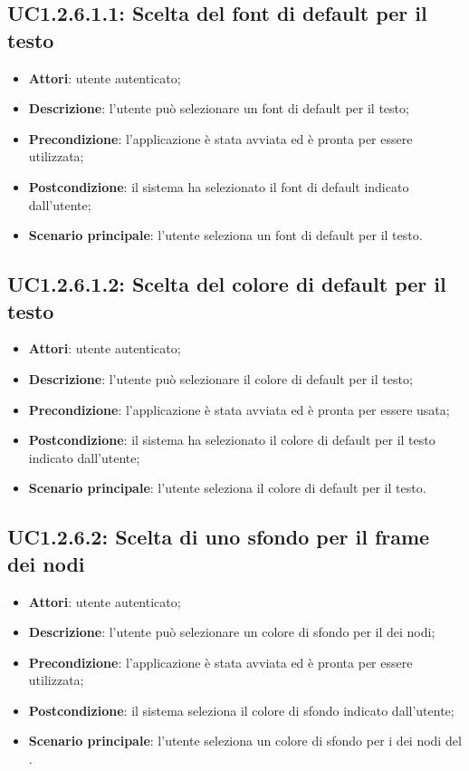 \subsection{UC1.2.6.1.1: Scelta del font di default per il testo}
\label{UC1.2.6.1.1}
\begin{itemize}
\item \textbf{Attori}: utente autenticato;
\item \textbf{Descrizione}: l'utente può selezionare un font di default per il testo;
\item \textbf{Precondizione}: l'applicazione è stata avviata ed è pronta per essere utilizzata;
\item \textbf{Postcondizione}: il sistema ha selezionato il font di default indicato dall'utente;
\item \textbf{Scenario principale}:
l'utente seleziona un font di default per il testo.
\end{itemize}
\subsection{UC1.2.6.1.2: Scelta del colore di default per il testo}
\label{UC1.2.6.1.2}
\begin{itemize}
\item \textbf{Attori}: utente autenticato;
\item \textbf{Descrizione}: l'utente può selezionare il colore di default per il testo;
\item \textbf{Precondizione}: l'applicazione è stata avviata ed è pronta per essere usata;
\item \textbf{Postcondizione}: il sistema ha selezionato il colore di default per il testo indicato dall'utente;
\item \textbf{Scenario principale}:
l'utente seleziona il colore di default per il testo.
\end{itemize}
\subsection{UC1.2.6.2: Scelta di uno sfondo per il frame dei nodi}
\label{UC1.2.6.2}
\begin{itemize}
\item \textbf{Attori}: utente autenticato;
\item \textbf{Descrizione}: l'utente può selezionare un colore di sfondo per il  dei nodi;
\item \textbf{Precondizione}: l'applicazione è stata avviata ed è pronta per essere utilizzata;
\item \textbf{Postcondizione}: il sistema seleziona il colore di sfondo indicato dall'utente;
\item \textbf{Scenario principale}:
l'utente seleziona un colore di sfondo per i  dei nodi del .
\end{itemize}
